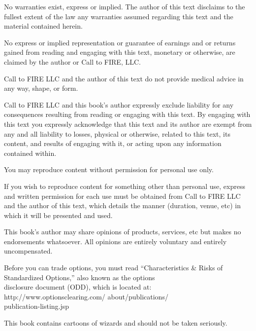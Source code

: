 No warranties exist, express or implied. The author of this text disclaims to the fullest extent of the law any warranties assumed regarding this text and the material contained herein. 

No express or implied representation or guarantee of earnings and or returns gained from reading and engaging with this text, monetary or otherwise, are claimed by the author or Call to FIRE, LLC.

Call to FIRE LLC and the author of this text do not provide medical advice in any way, shape, or form. 

Call to FIRE LLC and this book's author expressly exclude liability for any consequences resulting from reading or engaging with this text. By engaging with this text you expressly acknowledge that this text and its author are exempt from any and all liability to losses, physical or otherwise, related to this text, its content, and results of engaging with it, or acting upon any information contained within.

You may reproduce content without permission for personal use only. 

If you wish to reproduce content for something other than personal use, express and written permission for each use must be obtained from Call to FIRE LLC and the author of this text, which details the manner (duration, venue, etc) in which it will be presented and used.

This book's author may share opinions of products, services, etc but makes no endorsements whatsoever. All opinions are entirely voluntary and entirely uncompensated.

Before you can trade options, you must read “Characteristics \& Risks of Standardized Options,” also known as the options\\ disclosure document (ODD), which is located at:\\
http://www.optionsclearing.com/
about/publications/\\publication-listing.jsp

\newpage

\begin{center}
    \vspace*{4cm}
    \Large
    This book contains cartoons of wizards and should not be taken seriously.
    
\end{center}

